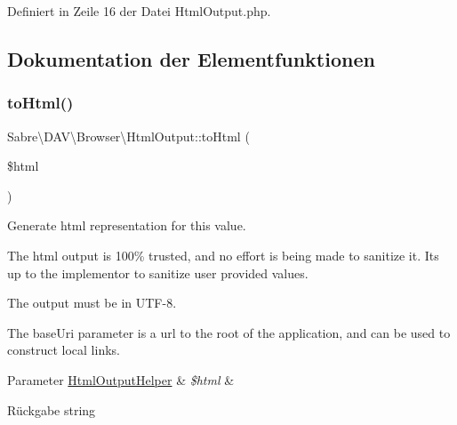 Definiert in Zeile 16 der Datei Html\+Output.\+php.



\subsection{Dokumentation der Elementfunktionen}
\mbox{\label{interface_sabre_1_1_d_a_v_1_1_browser_1_1_html_output_a53a24f82474cef8c1fcf00e87de3bf7c}} 
\subsubsection{\texorpdfstring{to\+Html()}{toHtml()}}
{\footnotesize\ttfamily Sabre\textbackslash{}\+D\+A\+V\textbackslash{}\+Browser\textbackslash{}\+Html\+Output\+::to\+Html (\begin{DoxyParamCaption}\item[{\mbox{\hyperlink{class_sabre_1_1_d_a_v_1_1_browser_1_1_html_output_helper}{Html\+Output\+Helper}}}]{\$html }\end{DoxyParamCaption})}

Generate html representation for this value.

The html output is 100\% trusted, and no effort is being made to sanitize it. It\textquotesingle{}s up to the implementor to sanitize user provided values.

The output must be in U\+T\+F-\/8.

The base\+Uri parameter is a url to the root of the application, and can be used to construct local links.


\begin{DoxyParams}[1]{Parameter}
\mbox{\hyperlink{class_sabre_1_1_d_a_v_1_1_browser_1_1_html_output_helper}{Html\+Output\+Helper}} & {\em \$html} & \\
\hline
\end{DoxyParams}
\begin{DoxyReturn}{Rückgabe}
string 
\end{DoxyReturn}


